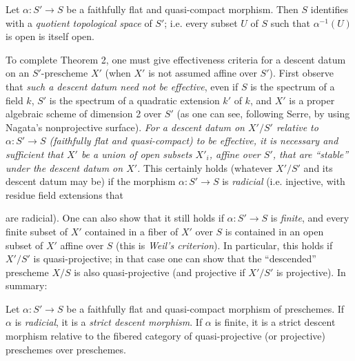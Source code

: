  Let $\alpha:S'\longrightarrow S$ be a faithfully flat and
quasi-compact morphism. Then $S$ identifies with a \emph{quotient topological
space} of $S'$; i.e. every subset $U$ of $S$ such that
$\alpha^{-1}(U)$ is open is itself open.

To complete Theorem 2, one must give effectiveness criteria for a descent datum
on an $S'$-prescheme $X'$ (when $X'$ is not assumed affine over $S'$). First
observe that \emph{such a descent datum need not be effective}, even if $S$ is
the spectrum of a field $k$, $S'$ is the spectrum of a quadratic extension
$k'$ of $k$, and $X'$ is a proper algebraic scheme of dimension 2 over $S'$
(as one can see, following Serre, by using Nagata's nonprojective surface).
\emph{For a descent datum on $X'/S'$ relative to
$\alpha:S'\longrightarrow S$ (faithfully flat and quasi-compact) to be
effective, it is necessary and sufficient that $X'$ be a union of open subsets
$X'_i$, affine over $S'$, that are “stable” under the descent datum on $X'$.}
This certainly holds (whatever $X'/S'$ and its descent datum may be) if the
morphism $\alpha:S'\longrightarrow S$ is \emph{radicial} (i.e. injective, with
residue field extensions that

are radicial). One can also show that it still holds if
$\alpha:S'\longrightarrow S$ is \emph{finite}, and every finite subset of
$X'$ contained in a fiber of $X'$ over $S$ is contained in an open subset of
$X'$ affine over $S$ (this is \emph{Weil's criterion}). In particular, this
holds if $X'/S'$ is quasi-projective; in that case one can show that the
“descended” prescheme $X/S$ is also quasi-projective (and projective if $X'/S'$
is projective). In summary:

 Let $\alpha:S'\longrightarrow S$ be a faithfully flat and
quasi-compact morphism of preschemes. If $\alpha$ is \emph{radicial}, it is a
\emph{strict descent morphism}. If $\alpha$ is finite, it is a strict descent
morphism relative to the fibered category of quasi-projective (or projective)
preschemes over preschemes.


